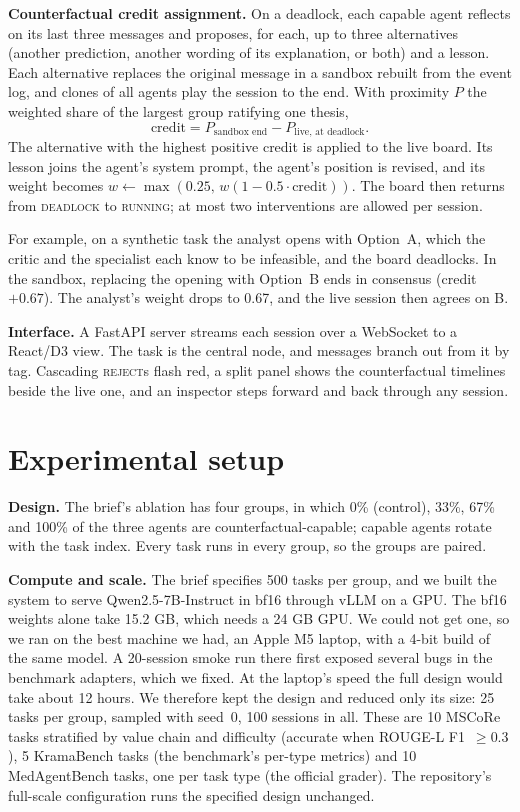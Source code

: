 \documentclass[11pt,a4paper,twocolumn]{article}
\begin{document}
\textbf{Counterfactual credit assignment.} On a deadlock, each capable agent reflects on its last
three messages and proposes, for each, up to three alternatives (another prediction, another
wording of its explanation, or both) and a lesson. Each alternative replaces the original
message in a sandbox rebuilt from the event log, and clones of all agents play the session to
the end. With proximity $P$ the weighted share of the largest group ratifying one thesis,
\[
\mathrm{credit}=P_{\text{sandbox end}}-P_{\text{live, at deadlock}}.
\]
The alternative with the highest positive credit is applied to the live board. Its lesson joins
the agent's system prompt, the agent's position is revised, and its weight becomes
$w\leftarrow\max(0.25,\,w(1-0.5\cdot\mathrm{credit}))$. The board then returns from
\textsc{deadlock} to \textsc{running}; at most two interventions are allowed per session.

For example, on a synthetic task the analyst opens with Option~A, which the critic and the
specialist each know to be infeasible, and the board deadlocks. In the sandbox, replacing the
opening with Option~B ends in consensus (credit $+0.67$). The analyst's weight drops to 0.67, and
the live session then agrees on B.

\textbf{Interface.} A FastAPI server streams each session over a WebSocket to a React/D3 view.
The task is the central node, and messages branch out from it by tag. Cascading
\textsc{reject}s flash red, a split panel shows the counterfactual timelines beside the live
one, and an inspector steps forward and back through any session.

\section{Experimental setup}
\textbf{Design.} The brief's ablation has four groups, in which 0\% (control), 33\%, 67\% and
100\% of the three agents are counterfactual-capable; capable agents rotate with the task index.
Every task runs in every group, so the groups are paired.

\textbf{Compute and scale.} The brief specifies 500 tasks per group, and we built the system to
serve Qwen2.5-7B-Instruct in bf16 through vLLM on a GPU. The bf16 weights alone take 15.2 GB,
which needs a 24 GB GPU. We could not get one, so we ran on the best machine we had, an Apple M5
laptop, with a 4-bit build of the same model. A 20-session smoke run there first exposed several
bugs in the benchmark adapters, which we fixed. At the laptop's speed the full design would take
about 12 hours. We therefore kept the design and reduced only its size: 25 tasks per group,
sampled with seed~0, 100 sessions in all. These are 10 MSCoRe tasks stratified by value chain
and difficulty (accurate when ROUGE-L F1~$\ge0.3$), 5 KramaBench tasks (the benchmark's
per-type metrics) and 10 MedAgentBench tasks, one per task type (the official grader). The
repository's full-scale configuration runs the specified design unchanged.
\end{document}
